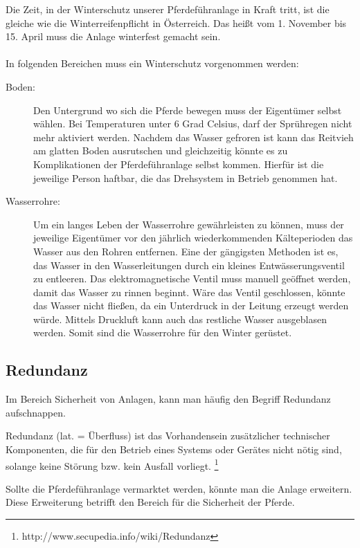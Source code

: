 Die Zeit, in der Winterschutz unserer Pferdeführanlage in Kraft tritt, ist die gleiche wie die Winterreifenpflicht in Österreich. Das heißt vom 1. November bis 15. April muss die Anlage winterfest gemacht sein. 
\\
\\
In folgenden Bereichen muss ein Winterschutz vorgenommen werden:
\begin{description}
\item[Boden:]
Den Untergrund wo sich die Pferde bewegen muss der Eigentümer selbst wählen. Bei Temperaturen unter 6 Grad Celsius, darf der Sprühregen nicht mehr aktiviert werden. Nachdem das Wasser gefroren ist kann das Reitvieh am glatten Boden ausrutschen und gleichzeitig könnte es zu Komplikationen der Pferdeführanlage selbst kommen. Hierfür ist die jeweilige Person haftbar, die das Drehsystem in Betrieb genommen hat.

\item[Wasserrohre:]

Um ein langes Leben der Wasserrohre gewährleisten zu können, muss der jeweilige Eigentümer vor den jährlich wiederkommenden Kälteperioden das Wasser aus den Rohren entfernen. Eine der gängigsten Methoden ist es, das Wasser in den Wasserleitungen durch ein kleines Entwässerungsventil zu entleeren. Das elektromagnetische Ventil muss manuell geöffnet werden, damit das Wasser zu rinnen beginnt. Wäre das Ventil geschlossen, könnte das Wasser nicht fließen, da ein Unterdruck in der Leitung erzeugt werden würde. Mittels Druckluft kann auch das restliche Wasser ausgeblasen werden. Somit sind die Wasserrohre für den Winter gerüstet.

\end{description}

\subsection{Redundanz}
\label{sec:redundanz}

Im Bereich Sicherheit von Anlagen, kann man häufig den Begriff Redundanz aufschnappen. 

Redundanz (lat. = Überfluss) ist das Vorhandensein zusätzlicher technischer Komponenten, die für den Betrieb eines Systems oder Gerätes nicht nötig sind, solange keine Störung bzw. kein Ausfall vorliegt. \footnote{http://www.secupedia.info/wiki/Redundanz}

Sollte die Pferdeführanlage vermarktet werden, könnte man die Anlage erweitern. Diese Erweiterung betrifft den Bereich für die Sicherheit der Pferde.

